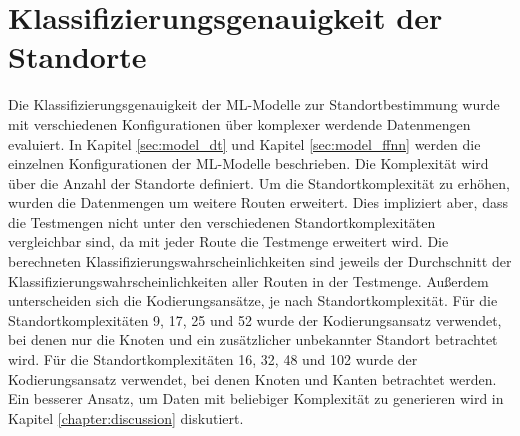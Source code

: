 \section{Klassifizierungsgenauigkeit der Standorte}
Die Klassifizierungsgenauigkeit der ML-Modelle zur Standortbestimmung wurde mit verschiedenen Konfigurationen über komplexer werdende Datenmengen evaluiert.
In Kapitel \ref{sec:model_dt} und Kapitel \ref{sec:model_ffnn} werden die einzelnen Konfigurationen der ML-Modelle beschrieben.
Die Komplexität wird über die Anzahl der Standorte definiert.
Um die Standortkomplexität zu erhöhen, wurden die Datenmengen um weitere Routen erweitert.
Dies impliziert aber, dass die Testmengen nicht unter den verschiedenen Standortkomplexitäten vergleichbar sind, da mit jeder Route die Testmenge erweitert wird.
Die berechneten Klassifizierungswahrscheinlichkeiten sind jeweils der Durchschnitt der Klassifizierungswahrscheinlichkeiten aller Routen in der Testmenge.
\newline
\newline
Außerdem unterscheiden sich die Kodierungsansätze, je nach Standortkomplexität.
Für die Standortkomplexitäten 9, 17, 25 und 52 wurde der Kodierungsansatz verwendet, bei denen nur die Knoten und ein zusätzlicher unbekannter Standort betrachtet wird.
Für die Standortkomplexitäten 16, 32, 48 und 102 wurde der Kodierungsansatz verwendet, bei denen Knoten und Kanten betrachtet werden.
Ein besserer Ansatz, um Daten mit beliebiger Komplexität zu generieren wird in Kapitel \ref{chapter:discussion} diskutiert.

